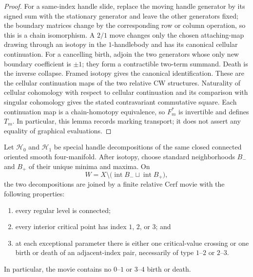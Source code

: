 \begin{proof}
For a same-index handle slide, replace the moving handle generator by its signed
sum with the stationary generator and leave the other generators fixed; the
boundary matrices change by the corresponding row or column operation, so this
is a chain isomorphism.  A $2/1$ move changes only the chosen attaching-map
drawing through an isotopy in the $1$-handlebody and has its canonical cellular
continuation.  For a cancelling birth, adjoin the two generators whose
only new boundary coefficient is $\pm1$; they form a contractible two-term
summand.  Death is the inverse collapse.  Framed isotopy gives the canonical
identification.  These are the cellular continuation maps of the two relative
CW structures.  Naturality of cellular cohomology with respect to cellular
continuation and its comparison with singular cohomology gives the stated
contravariant commutative square.  Each continuation map is a
chain-homotopy equivalence, so $F_m^*$ is invertible and defines $T_m$.  In
particular, this lemma records marking transport; it does not assert any
equality of graphical evaluations.
\end{proof}

\begin{proposition}
\label{prop:relative-fixed-extrema-cerf}
Let $\mathcal H_0$ and $\mathcal H_1$ be special handle decompositions of the
same closed connected oriented smooth four-manifold.  After isotopy, choose
standard neighborhoods $B_-$ and $B_+$ of their unique minima and maxima.
On
\[
  W=X\setminus\bigl(\operatorname{int}B_-\sqcup
                     \operatorname{int}B_+\bigr),
\]
the two decompositions are joined by a finite relative Cerf movie with the
following properties:
\begin{enumerate}[label=(\roman*),ref=\roman*]
  \item every regular level is connected;
  \item every interior critical point has index $1$, $2$, or $3$; and
  \item at each exceptional parameter there is either one critical-value
  crossing or one birth or death of an adjacent-index pair, necessarily of
  type $1$--$2$ or $2$--$3$.
\end{enumerate}
In particular, the movie contains no $0$--$1$ or $3$--$4$ birth or death.
\end{proposition}

